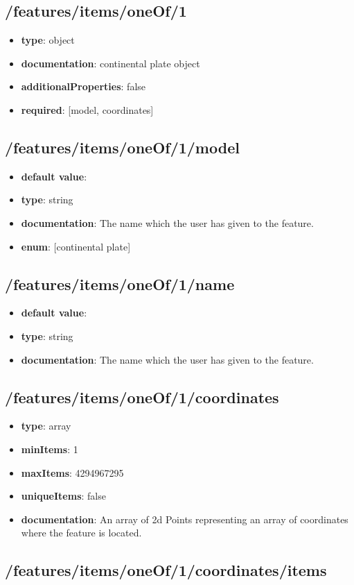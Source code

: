 \subsection{/features/items/oneOf/1}
\begin{itemize}\item {\bf type}: object
\item {\bf documentation}: continental plate object
\item {\bf additionalProperties}: false
\item {\bf required}: [model, coordinates]\end{itemize}
\subsection{/features/items/oneOf/1/model}
\begin{itemize}\item {\bf default value}: 
\item {\bf type}: string
\item {\bf documentation}: The name which the user has given to the feature.
\item {\bf enum}: [continental plate]\end{itemize}\subsection{/features/items/oneOf/1/name}
\begin{itemize}\item {\bf default value}: 
\item {\bf type}: string
\item {\bf documentation}: The name which the user has given to the feature.
\end{itemize}\subsection{/features/items/oneOf/1/coordinates}
\begin{itemize}\item {\bf type}: array
\item {\bf minItems}: 1
\item {\bf maxItems}: 4294967295
\item {\bf uniqueItems}: false
\item {\bf documentation}: An array of 2d Points representing an array of coordinates where the feature is located.
\end{itemize}\subsection{/features/items/oneOf/1/coordinates/items}
